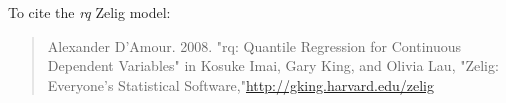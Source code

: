 To cite the \emph{ rq } Zelig model:
 \begin{verse}
 Alexander D'Amour. 2008. "rq: Quantile Regression for Continuous Dependent Variables" in Kosuke Imai, Gary King, and Olivia Lau, "Zelig: Everyone's Statistical Software,"\url{http://gking.harvard.edu/zelig} 
\end{verse}
